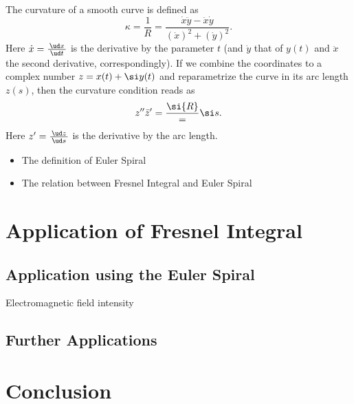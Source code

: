 \documentclass[12pt]{article}
\def\d#1{{\,\ud#1\,}}
\begin{document}
The curvature of a smooth curve is defined as 
\[  \kappa=\frac1R = \frac{\dot x\ddot y -\ddot x\dot y}{(\dot x)^2+(\dot y)^2}.
\]  Here $\dot{x}=\frac{\d{x}}{\d{t}}$ is the derivative by the parameter $t$ (and $\dot{y}$ that of $y(t)$ and $\ddot{x}$ the second derivative, correspondingly).  If we combine the coordinates to a complex number $z=x(t)+\si y(t)$ and reparametrize the curve in its arc length $z(s)$, then the curvature condition reads as
\[  z^{\prime\prime}\bar{z}' = \frac\si{R} = \si s.
\]  Here $z'=\frac{\d{z}}{\d{s}}$ is the derivative by the arc length.

\begin{itemize}\item The definition of Euler Spiral
\item The relation between Fresnel Integral and Euler Spiral
\end{itemize}


\section{Application of Fresnel Integral}
\subsection{Application using the Euler Spiral}
\cite{BH12}
Electromagnetic field intensity

\subsection{Further Applications}


\section{Conclusion}



\nocite{AS, BE, Sim, Str, WW}  %
\end{document}
